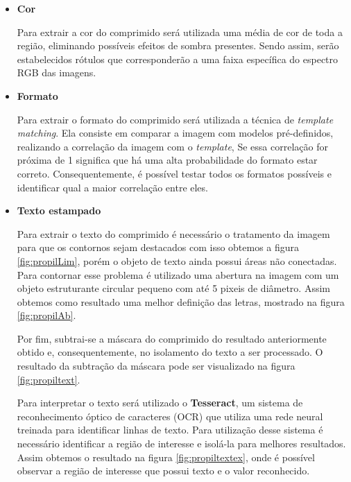 \begin{itemize}
    \item \textbf{Cor}
    
    Para extrair a cor do comprimido será utilizada uma média de cor de toda a região, eliminando possíveis efeitos de sombra presentes. Sendo assim, serão estabelecidos rótulos que corresponderão a uma faixa específica do espectro RGB das imagens.
    
    \newpage
    \item \textbf{Formato}
    
    Para extrair o formato do comprimido será utilizada a técnica de \textit{template matching}. Ela consiste em comparar a imagem com modelos pré-definidos, realizando a correlação da imagem com o \textit{template}, Se essa correlação for próxima de 1 significa que há uma alta probabilidade do formato estar correto. Consequentemente, é possível testar todos os formatos possíveis e identificar qual a maior correlação entre eles.
    
    \item \textbf{Texto estampado}
    
    Para extrair o texto do comprimido é necessário o tratamento da imagem para que os contornos sejam destacados com isso obtemos a figura \ref{fig:propilLim}, porém o objeto de texto ainda possui áreas não conectadas. Para contornar esse problema é utilizado uma abertura na imagem com um objeto estruturante circular pequeno com até 5 pixeis de diâmetro. Assim obtemos como resultado uma melhor definição das letras, mostrado na figura \ref{fig:propilAb}.
    
    Por fim, subtrai-se a máscara do comprimido do resultado anteriormente obtido e, consequentemente, no isolamento do texto a ser processado. O resultado da subtração da máscara pode ser visualizado na figura \ref{fig:propiltext}.
    
    Para interpretar o texto será utilizado o \textbf{Tesseract}, um sistema de reconhecimento óptico de caracteres (OCR) que utiliza uma rede neural treinada para identificar linhas de texto. Para utilização desse sistema é necessário identificar a região de interesse e isolá-la para melhores resultados. Assim obtemos o resultado na figura \ref{fig:propiltextex}, onde é possível observar a região de interesse que possui texto e o valor reconhecido.
    

\end{itemize}
